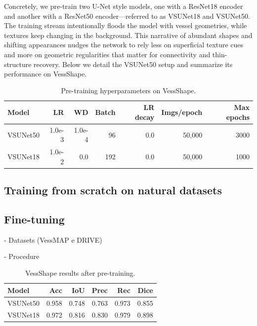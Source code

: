 \documentclass[%
reprint,
nofootinbib,
 amsmath,amssymb,
aps,
superscriptaddress,
showkeys,
longbibliography
]{revtex4-1}
\begin{document}
Concretely, we pre-train two U-Net style models, one with a ResNet18 encoder and another with a ResNet50 encoder—referred to as VSUNet18 and VSUNet50. The training stream intentionally floods the model with vessel geometries, while textures keep changing in the background. This narrative of abundant shapes and shifting appearances nudges the network to rely less on superficial texture cues and more on geometric regularities that matter for connectivity and thin-structure recovery. Below we detail the VSUNet50 setup and summarize its performance on VessShape.

\begin{table}[t]
    \caption{Pre-training hyperparameters on VessShape.}
    \label{tab:vs_hparams}
    \centering
    \begingroup
    \small
    \setlength{\tabcolsep}{3pt}
    \renewcommand{\arraystretch}{1.15}
    \begin{tabularx}{\textwidth}{l r r r r r r}
        \hline
        	\textbf{Model} & \textbf{LR} & \textbf{WD} & \textbf{Batch} & \textbf{LR decay} & \textbf{Imgs/epoch} & \textbf{Max epochs} \\
        \hline
        VSUNet50 & 1.0e-3 & 1.0e-4 & 96 & 0.0 & 50{,}000 & 3000 \\
        VSUNet18 & 1.0e-2 & 0.0 & 192 & 0.0 & 50{,}000 & 1000 \\
        \hline
    \end{tabularx}
    \endgroup
\end{table}





\subsection{Training from scratch on natural datasets}

\subsection{Fine-tuning}

- Datasets (VessMAP e DRIVE)

- Procedure

\begin{table}[t]
    \caption{VessShape results after pre-training.}
    \label{tab:vs_vessshape_results}
    \centering
    \begingroup
    \small
    \setlength{\tabcolsep}{3pt}
    \renewcommand{\arraystretch}{1.15}
    \begin{tabularx}{\columnwidth}{l r r r r r}
        \hline
        	\textbf{Model} & \textbf{Acc} & \textbf{IoU} & \textbf{Prec} & \textbf{Rec} & \textbf{Dice} \\
        \hline
        VSUNet50 & 0.958 & 0.748 & 0.763 & 0.973 & 0.855 \\
        VSUNet18 & 0.972 & 0.816 & 0.830 & 0.979 & 0.898 \\
        \hline
    \end{tabularx}
    \endgroup
\end{table}
\end{document}
